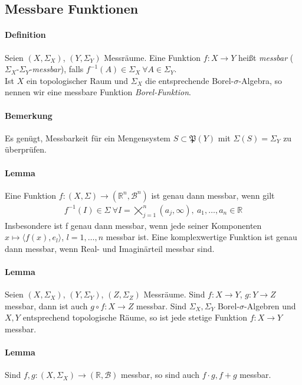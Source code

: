 \documentclass[12pt,a4paper,fleqn]{article}
\begin{document}
\subsection{Messbare Funktionen}
\paragraph{Definition} Seien $(X, \Sigma_X)$, $(Y, \Sigma_Y)$ Messräume. Eine Funktion $f\colon X \rightarrow Y$ heißt \textit{messbar} ($\Sigma_X$-$\Sigma_Y$-\textit{messbar}), falls $f^{-1}(A) \in \Sigma_X \ \forall A \in \Sigma_Y$.\\
Ist $X$ ein topologischer Raum und $\Sigma_X$ die entsprechende Borel-$\sigma$-Algebra, so nennen wir eine messbare Funktion \textit{Borel-Funktion}.

\paragraph{Bemerkung} Es genügt, Messbarkeit für ein Mengensystem $S \subset \mathfrak{P}(Y)$ mit ${\Sigma(S) = \Sigma_Y}$ zu überprüfen.

\paragraph{Lemma} Eine Funktion $f\colon (X, \Sigma)\rightarrow (\mathbb{R}^n, \mathcal{B}^n)$ ist genau dann messbar, wenn gilt
\begin{align*}
f^{-1} (I) \in \Sigma \ \forall I = \bigtimes\limits_{j = 1}^n (a_j, \infty),\ a_1, \dotsc, a_n \in \mathbb{R}
\end{align*}
Insbesondere ist f genau dann messbar, wenn jede seiner Komponenten $x \mapsto \langle f(x), e_l \rangle$, $l = 1, \dotsc, n$ messbar ist. Eine komplexwertige Funktion ist genau dann messbar, wenn Real- und Imaginärteil messbar sind.

\paragraph{Lemma} Seien $(X, \Sigma_X)$, $(Y, \Sigma_Y)$, $(Z, \Sigma_Z)$ Messräume. Sind $f\colon X \rightarrow Y$, ${g: Y \rightarrow Z}$ messbar, dann ist auch $g \circ f\colon X \rightarrow Z$ messbar. Sind $\Sigma_X, \Sigma_Y$ Borel-$\sigma$-Algebren und $X, Y$ entsprechend topologische Räume, so ist jede stetige Funktion $f\colon X \rightarrow Y$ messbar.

\paragraph{Lemma} Sind $f, g: (X, \Sigma_X) \rightarrow (\mathbb{R}, \mathcal{B})$ messbar, so sind auch $f \cdot g, f+g$ messbar.
\end{document}
